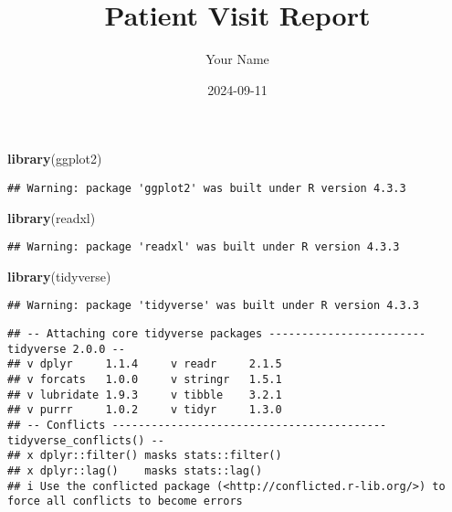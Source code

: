 \documentclass[
]{article}
\title{Patient Visit Report}
\author{Your Name}
\date{2024-09-11}
\newenvironment{Shaded}{\begin{snugshade}}{\end{snugshade}}
\newcommand{\FunctionTok}[1]{\textcolor[rgb]{0.13,0.29,0.53}{\textbf{#1}}}
\newcommand{\NormalTok}[1]{#1}
\begin{document}
\maketitle

\begin{Shaded}
\begin{Highlighting}[]
\FunctionTok{library}\NormalTok{(ggplot2)}
\end{Highlighting}
\end{Shaded}

\begin{verbatim}
## Warning: package 'ggplot2' was built under R version 4.3.3
\end{verbatim}

\begin{Shaded}
\begin{Highlighting}[]
\FunctionTok{library}\NormalTok{(readxl)}
\end{Highlighting}
\end{Shaded}

\begin{verbatim}
## Warning: package 'readxl' was built under R version 4.3.3
\end{verbatim}

\begin{Shaded}
\begin{Highlighting}[]
\FunctionTok{library}\NormalTok{(tidyverse)}
\end{Highlighting}
\end{Shaded}

\begin{verbatim}
## Warning: package 'tidyverse' was built under R version 4.3.3
\end{verbatim}

\begin{verbatim}
## -- Attaching core tidyverse packages ------------------------ tidyverse 2.0.0 --
## v dplyr     1.1.4     v readr     2.1.5
## v forcats   1.0.0     v stringr   1.5.1
## v lubridate 1.9.3     v tibble    3.2.1
## v purrr     1.0.2     v tidyr     1.3.0
## -- Conflicts ------------------------------------------ tidyverse_conflicts() --
## x dplyr::filter() masks stats::filter()
## x dplyr::lag()    masks stats::lag()
## i Use the conflicted package (<http://conflicted.r-lib.org/>) to force all conflicts to become errors
\end{verbatim}
\end{document}
